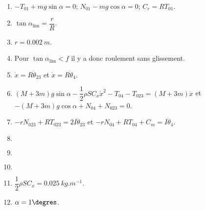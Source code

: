 \begin{multicols}{2}
\ifprof

\begin{corrige}
\end{corrige}
\else
\fi



\ifprof
\else
\ifcolle
\else
\begin{enumerate}
\item $-T_{01} +mg\sin\alpha = 0$; $N_{01} -mg\cos\alpha = 0$; $C_r=RT_{01}$.
\item $\tan \alpha_{\text{lim}} = \dfrac{r}{R}$.
\item $r=\SI{0,002}{m}$.
\item Pour $\tan \alpha_{\text{lim}}<f$ il y a donc roulement sans glissement.
\item $\dot{x}=R \dot{\theta}_{23}$ et $\dot{x}=R \dot{\theta}_{4} $.
\item $\left(M+3m\right)g\sin \alpha -\dfrac{1}{2}\rho S C_x \dot{x}^2-T_{04}-T_{023}=\left(M+3m\right)\ddot{x}$ et $-\left(M+3m\right)g \cos \alpha +N_{04}+N_{023}=0$.
\item $-rN_{023}+RT_{023}=2I\ddot{\theta}_{23}$ et $-rN_{04}+RT_{04}+C_m=I\ddot{\theta}_{4}$.
\item $\,$
\item $\,$
\item $\,$
\item $\dfrac{1}{2}\rho S C_x = \SI{0,025}{kg.m^{-1}}$.
\item $\alpha=1\degres$.
\end{enumerate}
\fi
\fi
\ifprof
\else
\end{multicols}
\fi

